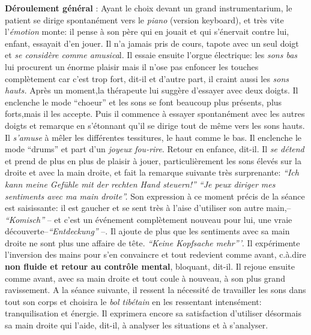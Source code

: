  	 \textbf{Déroulement général} : 
Ayant le choix devant un grand instrumentarium,
        le patient se dirige spontanément vers le \textit{piano }
        (version keyboard),  et très vite
        l'\textit{émotion} monte: il pense à son père qui en jouait et qui
        s'énervait contre lui, enfant, essayait d'en
        jouer. Il n'a jamais pris de cours, tapote avec un seul doigt et \textit{se considère comme
        amusica}l. Il essaie ensuite l'orgue électrique: les \textit{sons bas}
        lui procurent un énorme plaisir mais il n'ose pas enfoncer les touches
        complètement car c'est trop fort, dit-il et d'autre part, il
        craint aussi les
        \textit{sons hauts.}
        Après un moment,la thérapeute lui suggère d'essayer avec deux doigts.
        Il enclenche le mode ``choeur'' et les sons se font beaucoup
        plus présents, plus forts,mais il les accepte. Puis il commence à essayer spontanément
        avec les autres doigts et remarque en s'étonnant qu'il se
        dirige tout de même vers les sons
        hauts. Il \textit{s'amuse} à mêler les différentes tessitures,
        le haut comme le bas.
        Il enclenche le mode ``drums'' et part d'un\textit{ joyeux
        fou-rire}. Retour en enfance, dit-il.
        Il \textit{se détend} et prend de plus en plus de plaisir à jouer, particulièrement  les sons élevés
        sur la droite et avec la main droite, et fait
        la remarque suivante très surprenante:
        \textit{``Ich kann meine Gefühle mit der rechten Hand steuern!''
        ``Je peux diriger mes sentiments avec ma main droite''.}
 Son expression à ce moment précis de la séance est saisissante: il
        est gaucher et se sent très à l'aise d'utiliser son autre
        main,-- \textit{``Komisch''} -- et c'est un événement complètement nouveau pour lui, une vraie
        découverte--\textit{``Entdeckung''} --.
        Il ajoute de plus que les sentiments avec sa main
        droite ne sont plus une affaire de tête. \textit{``Keine
        Kopfsache mehr'''}. Il expérimente l'inversion des mains pour s'en convaincre et tout redevient comme
        avant, c.à.dire \textbf{non fluide et retour au contrôle
          mental}, 
        bloquant, dit-il. Il rejoue ensuite comme avant, avec sa main droite et tout
        coule à nouveau, à son plus grand ravissement.
        A la séance suivante, il ressent la nécessité de travailler
        les sons dans tout son corps et choisira le\textit{ bol tibétain }en
        les 
        ressentant intensément: tranquilisation et
        énergie. Il
        exprimera encore sa satisfaction d'utiliser désormais  sa main
        droite qui l'aide, dit-il, à analyser les
        situations et à 
        s'analyser.


